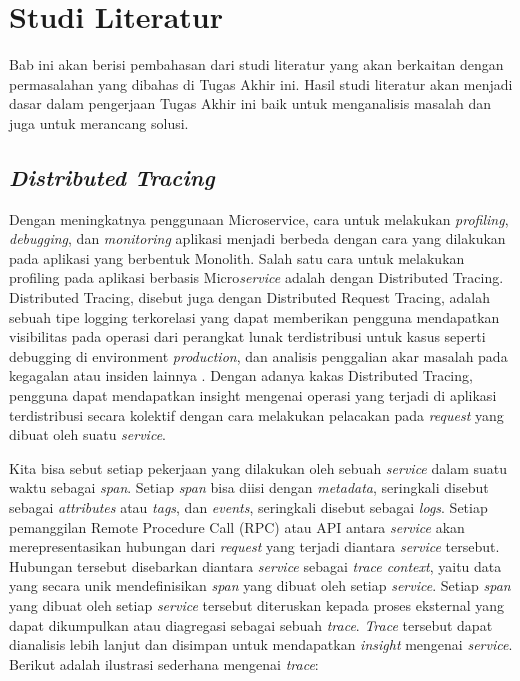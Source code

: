\chapter{Studi Literatur}

Bab ini akan berisi pembahasan dari studi literatur yang akan berkaitan dengan permasalahan yang dibahas di Tugas Akhir ini. Hasil studi literatur akan menjadi dasar dalam pengerjaan Tugas Akhir ini baik untuk menganalisis masalah dan juga untuk merancang solusi.

\section{\textit{Distributed Tracing}}
Dengan meningkatnya penggunaan Microservice, cara untuk melakukan \textit{profiling}, \textit{debugging}, dan \textit{monitoring} aplikasi menjadi berbeda dengan cara yang dilakukan pada aplikasi yang berbentuk Monolith.
Salah satu cara untuk melakukan profiling pada aplikasi berbasis Micro\textit{service} adalah dengan Distributed Tracing.
Distributed Tracing, disebut juga dengan Distributed Request Tracing, adalah sebuah tipe logging terkorelasi yang dapat memberikan pengguna mendapatkan visibilitas pada operasi dari perangkat lunak terdistribusi untuk kasus seperti debugging di environment \textit{production}, dan analisis penggalian akar masalah pada kegagalan atau insiden lainnya \citep{parker2020distributed}.
Dengan adanya kakas Distributed Tracing, pengguna dapat mendapatkan insight mengenai operasi yang terjadi di aplikasi terdistribusi secara kolektif dengan cara melakukan pelacakan pada \textit{request} yang dibuat oleh suatu \textit{service}.

Kita bisa sebut setiap pekerjaan yang dilakukan oleh sebuah \textit{service} dalam suatu waktu sebagai \textit{span}.
Setiap \textit{span} bisa diisi dengan \textit{metadata}, seringkali disebut sebagai \textit{attributes} atau \textit{tags}, dan \textit{events}, seringkali disebut sebagai \textit{logs}.
Setiap pemanggilan Remote Procedure Call (RPC) atau API antara \textit{service} akan merepresentasikan hubungan dari \textit{request} yang terjadi diantara \textit{service} tersebut.
Hubungan tersebut disebarkan diantara \textit{service} sebagai \textit{trace context}, yaitu data yang secara unik mendefinisikan \textit{span} yang dibuat oleh setiap \textit{service}.
Setiap \textit{span} yang dibuat oleh setiap \textit{service} tersebut diteruskan kepada proses eksternal yang dapat dikumpulkan atau diagregasi sebagai sebuah \textit{trace}.
\textit{Trace} tersebut dapat dianalisis lebih lanjut dan disimpan untuk mendapatkan \textit{insight} mengenai \textit{service}.
Berikut adalah ilustrasi sederhana mengenai \textit{trace}:


